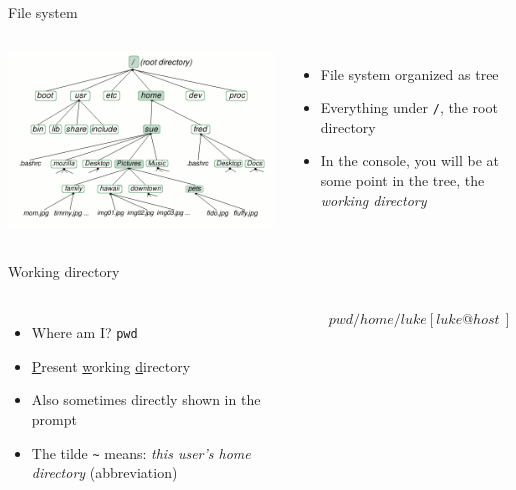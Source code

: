     \begin{frame}[t,fragile]{File system}
        \begin{columns}[T]
            \includegraphics[width=\columnwidth]{img/dirtree.png}
            \begin{itemize}
                \item File system organized as tree
                \item Everything under \texttt{/}, the root directory
                \item In the console, you will be at some point in the tree,
                    the \emph{working directory}
            \end{itemize}
        \end{columns}
    \end{frame}

    \begin{frame}[t,fragile]{Working directory}
        \begin{columns}[T]
            \begin{itemize}
                \item Where am I? \textrightarrow \: \texttt{pwd}
                \item \underline{P}resent \underline{w}orking \underline{d}irectory
                \item Also sometimes directly shown in the prompt
                \item The tilde \texttt{\textasciitilde} means:
                    \emph{this user's home directory} (abbreviation)
            \end{itemize}
            \begin{bashenv}$ pwd
/home/luke
[luke@host ~]$
            \end{bashenv}
        \end{columns}
    \end{frame}

